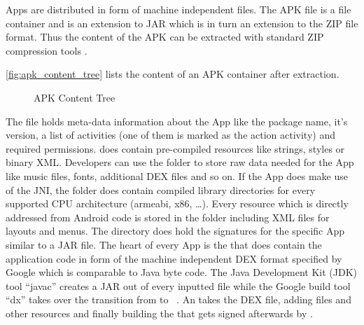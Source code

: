 Apps are distributed in form of machine independent  files.
The APK file is a file container and is an extension to
JAR which is in turn an extension to the ZIP file format.
Thus the content of the APK can be extracted with standard ZIP
compression tools \parencite{securityinternals}.

\autoref{fig:apk_content_tree} lists the content of an APK container
after extraction.

\begin{figure}[htb]
\caption[APK Content Tree]{APK Content Tree}
\label{fig:apk_content_tree}
\end{figure}

The  file holds meta-data information
about the App like the package name, it's version, a list of
activities (one of them is marked as the action  activity) and required permissions. 
does contain pre-compiled resources like strings, styles
or binary XML. Developers can use the  folder
to store raw data needed for the App like music files,
fonts, additional DEX files and so on. If the App does make use of the JNI,
the  folder does contain compiled library directories
for every supported CPU architecture (armeabi, x86, \ldots).
Every resource which is directly addressed from Android code
is stored in the  folder including XML files for
layouts and menus. The  directory does hold
the signatures for the specific App similar to a JAR file.
The heart of every App is the  that does
contain the application code in form of the machine independent
DEX format specified by Google \parencite{dex} which is comparable to
Java byte code. The Java Development
Kit (JDK) tool ``javac'' creates a JAR out of every inputted
  file while the Google build tool ``dx'' takes over
 the transition from  to  ~\parencite{dxtool}.
 An  takes the DEX file, adding  files and
 other resources and finally building the  that gets signed
 afterwards by .


